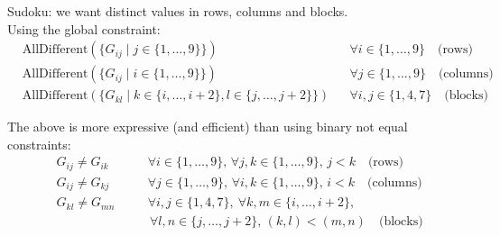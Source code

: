 \documentclass{cons-beamer}
\begin{document}
\begin{frame}
  \begin{example}
    Sudoku: we want distinct values in rows, columns and blocks.\\
    Using the  global constraint:
    \begin{align*}
      &\text{AllDifferent}(\{G_{ij} \mid j \in \{1, \ldots, 9\}\}) & & \forall i \in \{1, \ldots, 9\} \quad \text{(rows)} \\
      &\text{AllDifferent}(\{G_{ij} \mid i \in \{1, \ldots, 9\}\}) & & \forall j \in \{1, \ldots, 9\} \quad \text{(columns)} \\
      &\text{AllDifferent}(\{G_{kl} \mid k \in \{i, \ldots, i+2\}, l \in \{j, \ldots, j+2\}\}) & & \forall i, j \in \{1, 4, 7\} \quad \text{(blocks)}
    \end{align*}

    The above is more expressive (and efficient) than using binary not equal constraints:
    \begin{align*}
      &G_{ij} \neq G_{ik} & \quad & \forall i \in \{1, \ldots, 9\}, \, \forall j, k \in \{1, \ldots, 9\}, \, j < k \quad \text{(rows)} \\
      &G_{ij} \neq G_{kj} & \quad & \forall j \in \{1, \ldots, 9\}, \, \forall i, k \in \{1, \ldots, 9\}, \, i < k \quad \text{(columns)} \\
      &G_{kl} \neq G_{mn} & \quad & \forall i, j \in \{1, 4, 7\}, \ \forall k, m \in \{i, \ldots, i+2\}, \\
      & & & \, \forall l, n \in \{j, \ldots, j+2\}, \, (k, l) < (m, n) \quad \text{(blocks)}
    \end{align*}
  \end{example}
\end{frame}
\end{document}
